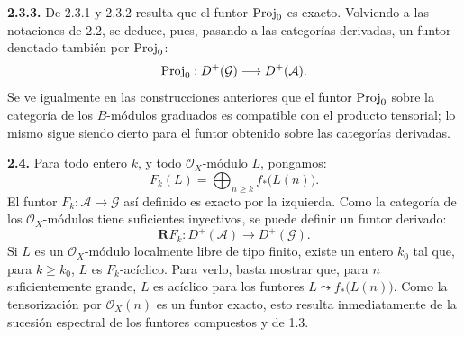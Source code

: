 \providecommand{\sisi}[2]{#2}

\textbf{2.3.3.} De 2.3.1 y 2.3.2 resulta que el funtor \(\operatorname{Proj}_0\) es exacto. Volviendo a las notaciones de 2.2, se deduce, pues, pasando a las categorías derivadas, un funtor denotado también por \(\operatorname{Proj}_0\):
\[
  \operatorname{Proj}_0:D^+(\mathcal G)\longrightarrow D^+(\mathcal A).
\]
Se ve igualmente en las construcciones anteriores que el funtor \(\operatorname{Proj}_0\) sobre la categoría de los \(B\)-módulos graduados es compatible con el producto tensorial; lo mismo sigue siendo cierto para el funtor obtenido sobre las categorías derivadas.


\textbf{2.4.} Para todo entero $k$, y todo $\mathcal O_X$-módulo $L$, pongamos:
\begin{equation}\tag{2.4.1}
  F_k(L)=\bigoplus_{n\geq k} f_*\bigl(L(n)\bigr).
\end{equation}
El funtor $F_k:\mathcal A\to\mathcal G$ así definido es exacto por la izquierda. Como la categoría de los $\mathcal O_X$-módulos tiene suficientes inyectivos, se puede definir un funtor derivado:
\begin{equation}\tag{2.4.2}
  \mathbf R F_k:D^+(\mathcal A)\longrightarrow D^+(\mathcal G).
\end{equation}
Si $L$ es un $\mathcal O_X$-módulo localmente libre de tipo finito, existe un entero $k_0$ tal que, para $k\geq k_0$, $L$ es $F_k$-acíclico. Para verlo, basta mostrar que, para $n$ suficientemente grande, $L$ es acíclico para los funtores $L\leadsto f_*\bigl(L(n)\bigr)$. Como la tensorización por $\mathcal O_X(n)$ es un funtor exacto, esto resulta inmediatamente de la sucesión espectral de los funtores compuestos y de 1.3.

